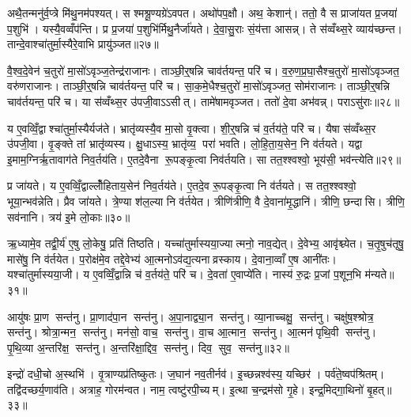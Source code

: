 अथै॒तन्मनु॑र्व॒प्त्रे मि॑थु॒नम॑पश्यत्। स श्मश्रू॒ण्यग्रे॑ऽवपत। अथो॑पप॒क्षौ। अथ॒ केशान्॑। ततो॒ वै स प्राजा॑यत प्र॒जया॑ प॒शुभि॑। यस्यै॒वव्वँप॑न्ति। प्र प्र॒जया॑ प॒शुभि॑र्मिथु॒नैर्जा॑यते। दे॒वा॒सु॒राः सं॒य॑त्ता आसन्न्। ते स॑व्वँथ्स॒रे व्याय॑च्छन्त। तान्दे॒वाश्चा॑तुर्मा॒स्यैरे॒वाभि प्रायु॑ञ्जत॥२७॥

वै॒श्व॒दे॒वेन॑ च॒तुरो॑ मा॒सो॑ऽवृञ्ज॒तेन्द्र॑राजानः। ताञ्छी॒र्॒षन्नि चाव॑र्तयन्त॒ परि॑ च। व॒रु॒ण॒प्र॒घा॒सैश्च॒तुरो॑ मा॒सो॑ऽवृञ्जत॒ वरु॑णराजानः। ताञ्छी॒र्॒षन्नि चाव॑र्तयन्त॒ परि॑ च। सा॒क॒मे॒धैश्च॒तुरो॑ मा॒सो॑ऽवृञ्जत॒ सोम॑राजानः। ताञ्छी॒र्॒षन्नि चाव॑र्तयन्त॒ परि॑ च। या स॑व्वँथ्स॒र उ॑पजी॒वाऽऽसीत्। तामे॑षामवृञ्जत। ततो॑ दे॒वा अभ॑वन्न्। पराऽसु॑राः॥२८॥

य ए॒वव्विँ॒द्वाश्चा॑तुर्मा॒स्यैर्यज॑ते। भ्रातृ॑व्यस्यै॒व मा॒सो वृ॒क्त्वा। शी॒र्॒षन्नि च॑ व॒र्तय॑ते॒ परि॑ च। यैषा स॑व्वँथ्स॒र उ॑पजी॒वा। वृ॒ङ्क्ते तां भ्रातृ॑व्यस्य। क्षु॒धाऽस्य॒ भ्रातृ॑व्य॒ परा॑ भवति। लो॒हि॒ता॒य॒सेन॒ नि व॑र्तयते। यद्वा इ॒माम॒ग्निर्ऋ॒तावाग॑ते निव॒र्तय॑ति। ए॒तदे॒वैना रू॒पङ्कृ॒त्वा निव॑र्तयति। सा तत॒श्श्वश्वो॒ भूय॑सी॒ भव॑न्त्येति॥२९॥

प्र जा॑यते। य ए॒वव्विँ॒द्वाल्लोँ॑हिताय॒सेन॑ निव॒र्तय॑ते। ए॒तदे॒व रू॒पङ्कृ॒त्वा नि व॑र्तयते। स तत॒श्श्वश्वो॒ भूया॒न्भव॑न्नेति। प्रैव जा॑यते। त्रे॒ण्या श॑ल॒ल्या नि व॑र्तयेत। त्रीणि॑त्रीणि॒ वै दे॒वाना॑मृ॒द्धानि॑। त्रीणि॒ छन्दासि। त्रीणि॒ सव॑नानि। त्रय॑ इ॒मे लो॒काः॥३०॥

ऋ॒ध्यामे॒व तद्वी॒र्य॑ ए॒षु लो॒केषु॒ प्रति॑ तिष्ठति। यच्चा॑तुर्मास्यया॒ज्यात्मनो॒ नाव॒द्येत्। दे॒वेभ्य॒ आवृ॑श्च्येत। च॒तृ॒षुच॑तृषु॒ मासे॑षु॒ नि व॑र्तयेत। प॒रोक्ष॑मे॒व तद्दे॒वेभ्य॑ आ॒त्मनोऽव॑द्य॒त्यनाव्रस्काय। दे॒वाना॒व्वाँ ए॒ष आनी॑तः। यश्चा॑तुर्मास्यया॒जी। य ए॒वव्विँ॒द्वान्नि च॑ व॒र्तय॑ते॒ परि॑ च। दे॒वता॑ ए॒वाप्ये॑ति। नास्य॑ रु॒द्रः प्र॒जां प॒शून॒भि म॑न्यते॥३१॥\anuvakamend[ए॒त्ये॒त्य॒यु॒ञ्ज॒तासु॑रा एति लो॒का म॑न्यते]

आयु॑षः प्रा॒ण सन्त॑नु। प्रा॒णाद॑पा॒न सन्त॑नु। अ॒पा॒नाद्व्या॒न सन्त॑नु। व्या॒नाच्चक्षु॒ सन्त॑नु। चक्षु॑ष॒श्श्रोत्र॒ सन्त॑नु। श्रोत्रा॒न्मन॒ सन्त॑नु। मन॑सो॒ वाच॒ सन्त॑नु। वा॒च आ॒त्मान॒ सन्त॑नु। आ॒त्मन॑पृथि॒वी सन्त॑नु। पृ॒थि॒व्या अ॒न्तरि॑क्ष॒ सन्त॑नु। अ॒न्तरि॑क्षा॒द्दिव॒ सन्त॑नु। दिव॒ सुव॒ सन्त॑नु॥३२॥\anuvakamend[अ॒न्तरि॑क्ष॒ सन्त॑नु॒ द्वे च॑]

इन्द्रो॑ दधी॒चो अ॒स्थभि॑। वृ॒त्राण्यप्र॑तिष्कुतः। ज॒घान॑ नव॒तीर्नव॑। इ॒च्छन्नश्व॑स्य॒ यच्छिर॑। पर्व॑ते॒ष्वप॑श्रितम्। तद्वि॑दच्छर्य॒णाव॑ति। अत्राह॒ गोरम॑न्वत। नाम॒ त्वष्टु॑रपी॒च्यम्। इ॒त्था च॒न्द्रम॑सो गृ॒हे। इन्द्र॒मिद्गा॒थिनो॑ बृ॒हत्॥३३॥

